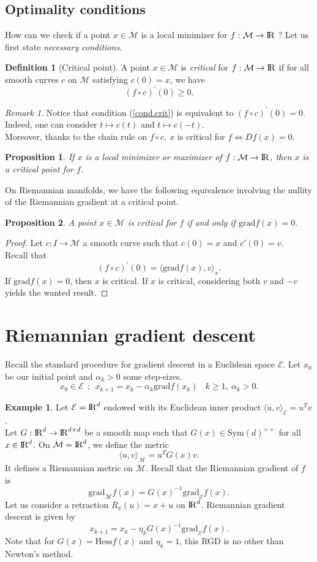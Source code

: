 \documentclass[10pt,a4paper]{book}
\theoremstyle{definition}
\newtheorem{defn}{Definition}[section]
\newtheorem{exm}{Example}[section]
\theoremstyle{plain}
\newtheorem{prop}{Proposition}[section]
\theoremstyle{remark}
\newtheorem{rmk}{Remark}[section]
\newcommand{\grad}{\textrm{grad}}
\newcommand{\E}{\mathcal{E}}
\newcommand \M {\mathcal{M}}
\def\R{{\rm I\kern-0.16em R}}
\begin{document}
\subsection{Optimality conditions}
How can we check if a point $x\in \M$ is a local minimizer for $f:\M\to \R$ ? Let us first state \emph{necessary conditions}.

\begin{defn}[Critical point]
A point $x\in \M$ is \emph{critical} for $f:\M \to \R$ if for all smooth curves $c$ on $\M$ satisfying $c(0)=x$, we have
\begin{equation}\label{cond.crit}
(f\circ c)^{\prime}(0)\ge 0.
\end{equation}
\end{defn}
\begin{rmk}
Notice that condition (\ref{cond.crit}) is equivalent to $(f\circ c)^{\prime}(0)=0$. Indeed, one can consider $t\mapsto c(t)$ and $t\mapsto c(-t)$. \\ Moreover, thanks to the chain rule on $f\circ c,~x$ is critical for $f \iff Df(x)=0$.
\end{rmk}
\begin{prop}
If $x$ is a local minimizer or maximizer of $f:\M \to \R$, then $x$ is a critical point for $f$.
\end{prop}
On Riemannian manifolds, we have the following equivalence involving the nullity of the Riemannian gradient at a critical point.
\begin{prop}
A point $x\in \M$ is critical for $f$ if and only if $\grad f(x)=0.$
\end{prop}
\begin{proof}
Let $c:I\to \M$ a smooth curve such that $c(0)=x$ and $c'(0)=v$. \\ Recall that
$$(f\circ c)^{\prime}(0)=\langle \grad f(x),v\rangle_x.$$
If $\grad f(x)=0$, then $x$ is critical. If $x$ is critical, considering both $v$ and $-v$ yields the wanted result.
\end{proof}
\section{Riemannian gradient descent}
Recall the standard procedure for gradient descent in a Euclidean space $\E$. Let $x_0$ be our initial point and $\alpha_k>0$ some step-sizes. 
$$x_0 \in \E~~;~~x_{k+1}=x_k-\alpha_k \grad f(x_k)~~~~k\ge 1,~\alpha_k>0.$$
\begin{exm}
Let $\E=\R^d$ endowed with its Euclidean inner product $\langle u,v \rangle_{\E}=u^Tv$. \\ Let $G:\R^d\to \R^{d\times d}$ be a smooth map such that $G(x)\in \text{Sym}(d)^{++}$ for all $x\in \R^d$. On $\M=\R^d$, we define the metric
$$\langle u,v\rangle_{\M}=u^TG(x)v.$$
It defines a Riemannian metric on $\M$. Recall that the Riemannian gradient of $f$ is
$$\grad_{\M}f(x)=G(x)^{-1}\grad_{\E}f(x).$$
Let us consider a retraction $R_x(u)=x+u$ on $\R^d$. Riemannian gradient descent is given by
$$x_{k+1}=x_k-\eta_kG(x)^{-1}\grad_{\E}f(x).$$
Note that for $G(x)=\text{Hess}f(x)$ and $\eta_k=1$, this RGD is no other than Newton's method.
\end{exm}
\end{document}

